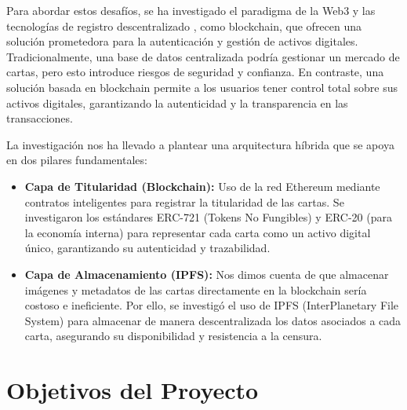 Para abordar estos desafíos, se ha investigado el paradigma de la Web3 y las tecnologías de registro descentralizado \textbf{\cite{ethereum_org}},
como blockchain, que ofrecen una solución prometedora para la autenticación y gestión de activos digitales. Tradicionalmente,
una base de datos centralizada podría gestionar un mercado de cartas, pero esto introduce riesgos de seguridad y confianza. 
En contraste, una solución basada en blockchain permite a los usuarios tener control total sobre sus activos digitales, 
garantizando la autenticidad y la transparencia en las transacciones.

La investigación nos ha llevado a plantear una arquitectura híbrida que se apoya en dos pilares fundamentales:
\begin{itemize}
    \item \textbf{Capa de Titularidad (Blockchain):} Uso de la red Ethereum mediante contratos inteligentes para registrar 
    la titularidad de las cartas. Se investigaron los estándares ERC-721 (Tokens No Fungibles) y ERC-20 (para la economía 
    interna) para representar cada carta como un activo digital único, garantizando su autenticidad y trazabilidad.
    \item \textbf{Capa de Almacenamiento (IPFS):} Nos dimos cuenta de que almacenar imágenes y metadatos de las cartas 
    directamente en la blockchain sería costoso e ineficiente. Por ello, se investigó el uso de IPFS (InterPlanetary File
    System) \textbf{\cite{ipfs_docs}} para almacenar de manera descentralizada los datos asociados a cada carta, asegurando su disponibilidad y 
    resistencia a la censura.
\end{itemize}


\section{Objetivos del Proyecto}

